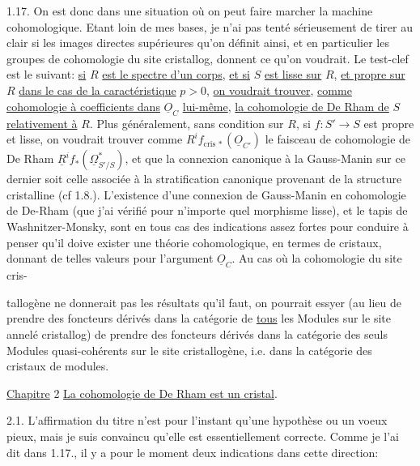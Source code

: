 1.17. On est donc dans une situation où on peut faire marcher la machine cohomologique. Etant loin de mes bases, je n'ai pas tenté sérieusement de tirer au clair si les images directes supérieures qu'on définit ainsi, et en particulier les groupes de cohomologie du site cristallog, donnent ce qu'on voudrait. Le test-clef est le suivant: \uline{si} $R$ \uline{est le spectre d'un corps}, \uline{et si} $S$ \uline{est lisse sur} $R$, \uline{et propre sur} $R$ \uline{dans le cas de la caractéristique} $p>0$, \uline{on voudrait trouver}, \uline{comme cohomologie à coefficients dans} $\underline{O}_C$ \uline{lui-même}, \uline{la cohomologie de De Rham de} $S$ \uline{relativement à} $R$.
Plus généralement, sans condition sur $R$, si $f:S'\to S$ est propre et lisse, on voudrait trouver comme  $R^if_{\mathrm{cris}\,*}(\underline{O}_{C'})$  le faisceau de cohomologie de De Rham $\underline{R}^if_*(\underline{\Omega}^{*}_{S'/S})$,  et  que la connexion canonique à la Gauss-Manin sur ce dernier soit celle associée à la stratification canonique provenant de la structure cristalline (cf 1.8.). L'existence d'une connexion de Gauss-Manin en cohomologie de De-Rham (que j'ai vérifié pour n'importe quel morphisme lisse), et le tapis de Washnitzer-Monsky, sont en tous cas des indications assez fortes pour conduire à penser qu'il doive exister une théorie cohomologique, en termes de cristaux, donnant de telles valeurs pour l'argument $\underline{O}_C$. Au cas où la cohomologie du site cris-


tallogène ne donnerait pas les résultats qu'il faut, on pourrait essyer (au lieu de prendre des foncteurs dérivés dans la catégorie de \uline{tous} les Modules sur le site annelé cristallog) de prendre des foncteurs dérivés dans la catégorie des seuls Modules quasi-cohérents sur le site cristallogène, i.e. dans la catégorie des cristaux de modules. 

\uline{Chapitre} 2 \uline{La cohomologie de De Rham est un cristal}.

2.1. L'affirmation du titre n'est pour l'instant qu'une hypothèse ou un voeux pieux, mais je suis convaincu qu'elle est essentiellement correcte. Comme je l'ai dit dans 1.17., il y a pour le moment deux indications dans cette direction:

